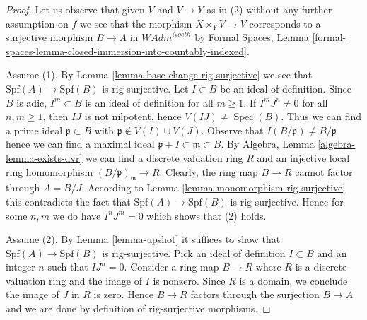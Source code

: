 \documentclass[10pt,a4paper]{amsart}
\theoremstyle{plain}
\theoremstyle{definition}
\theoremstyle{remark}
\numberwithin{equation}{subsection}
\def\Spec{\mathop{\mathrm{Spec}}}
\begin{document}
\begin{proof}
Let us observe that given $V$ and $V \to Y$ as in (2) without any
further assumption on $f$ we see that the morphism $X \times_Y V \to V$
corresponds to a surjective morphism $B \to A$ in $\textit{WAdm}^{Noeth}$
by Formal Spaces, Lemma
\ref{formal-spaces-lemma-closed-immersion-into-countably-indexed}.

\medskip\noindent
Assume (1). By Lemma \ref{lemma-base-change-rig-surjective} we see that
$\text{Spf}(A) \to \text{Spf}(B)$ is rig-surjective.
Let $I \subset B$ be an ideal of definition. Since $B$ is adic,
$I^m \subset B$ is an ideal of definition for all $m \geq 1$.
If $I^m J^n \not = 0$ for all $n, m \geq 1$, then
$IJ$ is not nilpotent, hence $V(IJ) \not = \Spec(B)$.
Thus we can find a prime ideal $\mathfrak p \subset B$
with $\mathfrak p \not \in V(I) \cup V(J)$.
Observe that $I(B/\mathfrak p) \not = B/\mathfrak p$
hence we can find a maximal ideal
$\mathfrak p + I \subset \mathfrak m \subset B$.
By Algebra, Lemma \ref{algebra-lemma-exists-dvr}
we can find a discrete valuation ring $R$
and an injective local ring homomorphism $(B/\mathfrak p)_\mathfrak m \to R$.
Clearly, the ring map $B \to R$ cannot factor through $A = B/J$.
According to Lemma \ref{lemma-monomorphism-rig-surjective}
this contradicts the fact that $\text{Spf}(A) \to \text{Spf}(B)$
is rig-surjective. Hence for some $n, m$ we do have
$I^n J^m = 0$ which shows that (2) holds.

\medskip\noindent
Assume (2). By Lemma \ref{lemma-upshot} it suffices to show
that $\text{Spf}(A) \to \text{Spf}(B)$ is rig-surjective.
Pick an ideal of definition $I \subset B$ and an integer $n$
such that $I J^n = 0$.
Consider a ring map $B \to R$ where $R$ is a discrete valuation
ring and the image of $I$ is nonzero. Since $R$ is a domain, we
conclude the image of $J$ in $R$ is zero. Hence $B \to R$
factors through the surjection $B \to A$ and we are done by
definition of rig-surjective morphisms.
\end{proof}
\end{document}
